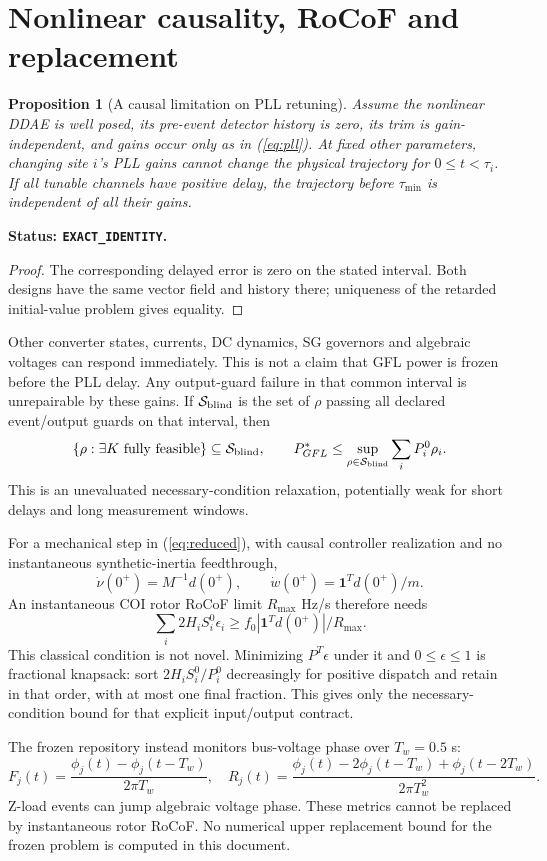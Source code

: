 \documentclass[11pt]{article}
\newtheorem{proposition}[theorem]{Proposition}
\newcommand{\one}{\mathbf{1}}
\newcommand{\status}[1]{\par\smallskip\noindent\textbf{Status: \texttt{#1}.}\ }
\begin{document}
\section{Nonlinear causality, RoCoF and replacement}
\begin{proposition}[A causal limitation on PLL retuning]
Assume the nonlinear DDAE is well posed, its pre-event detector history
is zero, its trim is gain-independent, and gains occur only as in
(\ref{eq:pll}). At fixed other parameters, changing site $i$'s PLL
gains cannot change the physical trajectory for $0\leq t<\tau_i$.
If all tunable channels have positive delay, the trajectory before
$\tau_{\min}$ is independent of all their gains.
\end{proposition}
\status{EXACT\_IDENTITY}
\begin{proof}
The corresponding delayed error is zero on the stated interval.
Both designs have the same vector field and history there;
uniqueness of the retarded initial-value problem gives equality.
\end{proof}
Other converter states, currents, DC dynamics, SG governors and
algebraic voltages can respond immediately. This is not a claim
that GFL power is frozen before the PLL delay.
Any output-guard failure in that common interval is unrepairable
by these gains. If $\mathcal S_{\rm blind}$ is the set of $\rho$
passing all declared event/output guards on that interval, then
\[
 \{\rho:\exists K\ \text{fully feasible}\}\subseteq\mathcal S_{\rm blind},
 \qquad
 P_{GFL}^*\leq\sup_{\rho\in\mathcal S_{\rm blind}}\sum_iP_i^0\rho_i .
\]
This is an unevaluated necessary-condition relaxation, potentially
weak for short delays and long measurement windows.

For a mechanical step in (\ref{eq:reduced}), with causal controller
realization and no instantaneous synthetic-inertia feedthrough,
\[
 \dot\nu(0^+)=M^{-1}d(0^+),\qquad
 \dot w(0^+)=\one^Td(0^+)/m .
\]
An instantaneous COI rotor RoCoF limit $R_{\max}$ Hz/s therefore needs
\begin{equation}
 \sum_i2H_iS_i^0\epsilon_i
 \geq f_0|\one^Td(0^+)|/R_{\max}. \label{eq:floor}
\end{equation}
This classical condition is not novel. Minimizing $P^T\epsilon$
under it and $0\leq\epsilon\leq1$ is fractional knapsack: sort
$2H_iS_i^0/P_i^0$ decreasingly for positive dispatch and retain in
that order, with at most one final fraction. This gives only the
necessary-condition bound for that explicit input/output contract.

The frozen repository instead monitors bus-voltage phase over
$T_w=0.5$ s:
\[
 F_j(t)=\frac{\phi_j(t)-\phi_j(t-T_w)}{2\pi T_w},\quad
 R_j(t)=\frac{\phi_j(t)-2\phi_j(t-T_w)+\phi_j(t-2T_w)}{2\pi T_w^2}.
\]
Z-load events can jump algebraic voltage phase.
These metrics cannot be replaced by instantaneous rotor RoCoF.
No numerical upper replacement bound for the frozen problem is
computed in this document.
\end{document}
